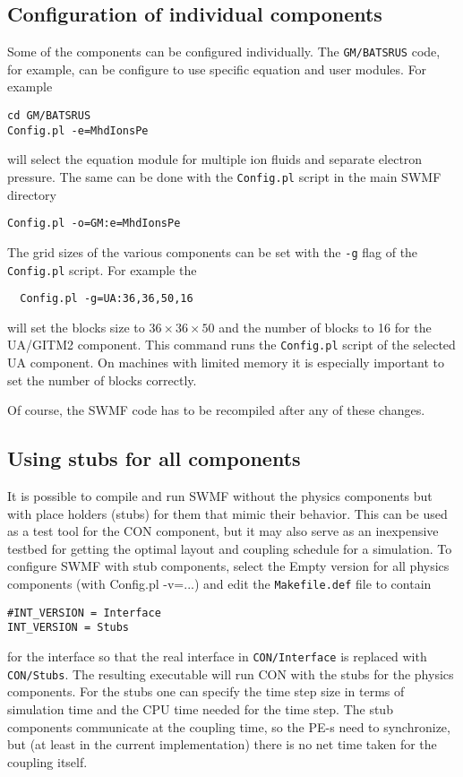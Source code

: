 \subsection{Configuration of individual components}

Some of the components can be configured individually. 
The {\tt GM/BATSRUS} code, for example, can be configure to
use specific equation and user modules.
For example
\begin{verbatim}
cd GM/BATSRUS
Config.pl -e=MhdIonsPe
\end{verbatim}
will select the equation module for multiple ion fluids and separate
electron pressure. The same can be done with the {\tt Config.pl} script
in the main SWMF directory
\begin{verbatim}
Config.pl -o=GM:e=MhdIonsPe
\end{verbatim}
The grid sizes of the various components can be set with the 
{\tt -g} flag of the {\tt Config.pl} script.
For example the
\begin{verbatim}
  Config.pl -g=UA:36,36,50,16
\end{verbatim}
will set the blocks size to $36\times 36\times 50$ and the number of blocks to 
16 for the UA/GITM2 component. This command runs the {\tt Config.pl}
script of the selected UA component. 
On machines with limited memory it is especially important to
set the number of blocks correctly. 

Of course, the SWMF code has to be recompiled after any of these changes.

\subsection{Using stubs for all components}

It is possible to compile and run SWMF without the physics components
but with place holders (stubs) for them that mimic their behavior.
This can be used as a test tool for the CON component, but it may
also serve as an inexpensive testbed for getting the optimal layout
and coupling schedule for a simulation. To configure SWMF with 
stub components, select the Empty version for all physics components
(with Config.pl -v=...) and edit the {\tt Makefile.def} file to
contain
\begin{verbatim}
#INT_VERSION = Interface
INT_VERSION = Stubs
\end{verbatim}
for the interface so that the real interface in {\tt CON/Interface}
is replaced with {\tt CON/Stubs}.
The resulting executable will run CON with 
the stubs for the physics components. For the stubs one can
specify the time step size in terms of simulation time and the
CPU time needed for the time step. The stub components communicate
at the coupling time, so the PE-s need to synchronize, but 
(at least in the current implementation) there is no net time taken
for the coupling itself. 

